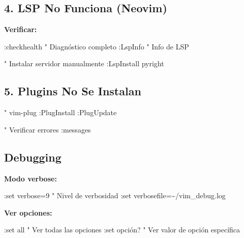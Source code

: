 \documentclass[
  doc,
  floatsintext,
  longtable,
  a4paper,
  nolmodern,
  notxfonts,
  notimes,
  12pt,
  colorlinks=true,linkcolor=blue,citecolor=blue,urlcolor=blue]{apa7}
\newenvironment{Shaded}{\begin{snugshade}}{\end{snugshade}}
\newcommand{\NormalTok}[1]{\textcolor[rgb]{0.00,0.23,0.31}{#1}}
\begin{document}
\subsection{4. LSP No Funciona (Neovim)}\label{lsp-no-funciona-neovim}

\textbf{Verificar:}

\begin{Shaded}
\begin{Highlighting}[]
\NormalTok{:checkhealth        " Diagnóstico completo}
\NormalTok{:LspInfo            " Info de LSP}

\NormalTok{" Instalar servidor manualmente}
\NormalTok{:LspInstall pyright}
\end{Highlighting}
\end{Shaded}

\subsection{5. Plugins No Se Instalan}\label{plugins-no-se-instalan}

\begin{Shaded}
\begin{Highlighting}[]
\NormalTok{" vim{-}plug}
\NormalTok{:PlugInstall}
\NormalTok{:PlugUpdate}

\NormalTok{" Verificar errores}
\NormalTok{:messages}
\end{Highlighting}
\end{Shaded}

\subsection{Debugging}\label{debugging}

\textbf{Modo verbose:}

\begin{Shaded}
\begin{Highlighting}[]
\NormalTok{:set verbose=9      " Nivel de verbosidad}
\NormalTok{:set verbosefile=\textasciitilde{}/vim\_debug.log}
\end{Highlighting}
\end{Shaded}

\textbf{Ver opciones:}

\begin{Shaded}
\begin{Highlighting}[]
\NormalTok{:set all            " Ver todas las opciones}
\NormalTok{:set opción?        " Ver valor de opción específica}
\end{Highlighting}
\end{Shaded}
\end{document}
